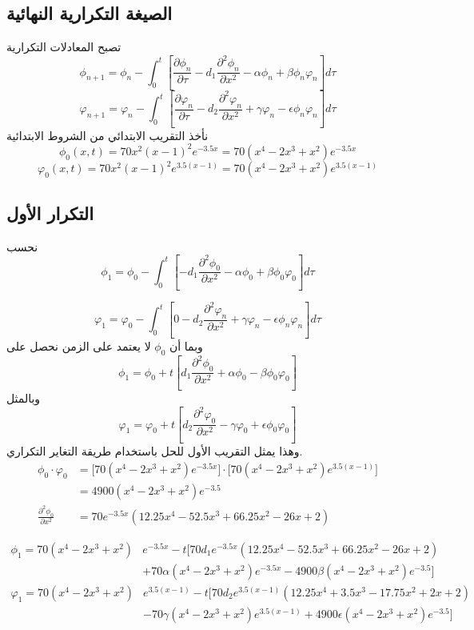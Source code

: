 \subsection*{الصيغة التكرارية النهائية}
تصبح المعادلات التكرارية
\[
\phi_{n+1} =
\phi_n -
\int_0^t
\left[
\frac{\partial \phi_n}{\partial \tau}
- d_1 \frac{\partial^2 \phi_n}{\partial x^2}
- \alpha \phi_n
+ \beta \phi_n \varphi_n
\right] d\tau
\]
\[
\varphi_{n+1} =
\varphi_n -
\int_0^t
\left[
\frac{\partial \varphi_n}{\partial \tau}
- d_2 \frac{\partial^2 \varphi_n}{\partial x^2}
+ \gamma \varphi_n
- \epsilon \phi_n \varphi_n
\right] d\tau
\]
نأخذ التقريب الابتدائي من الشروط الابتدائية
\[
\phi_0(x,t)=70x^2(x-1)^2 e^{-3.5 x} = 70 (x^4 - 2x^3 + x^2)e^{-3.5x} 
\]
\[
\varphi_0(x,t)=70x^2(x-1)^2 e^{3.5 (x-1)} = 70(x^4 - 2x^3 + x^2)e^{3.5(x-1)}
\]
\subsection*{التكرار الأول}
نحسب
\[
\phi_1=
\phi_0
-
\int_0^t
\left[
- d_1 \frac{\partial^2 \phi_0}{\partial x^2}
- \alpha \phi_0
+ \beta \phi_0 \varphi_0
\right] d\tau
\]

\[
\varphi_{1} =
\varphi_0 -
\int_0^t
\left[
0- d_2 \frac{\partial^2 \varphi_n}{\partial x^2}
+ \gamma \varphi_n
- \epsilon \phi_n \varphi_n
\right] d\tau
\]
وبما أن $\phi_0$ لا يعتمد على الزمن نحصل على
\[
\phi_1=
\phi_0
+
t
\left[
d_1 \frac{\partial^2 \phi_0}{\partial x^2}
+
\alpha \phi_0
-
\beta \phi_0 \varphi_0
\right]
\]
وبالمثل
\[
\varphi_1=
\varphi_0
+
t
\left[
d_2 \frac{\partial^2 \varphi_0}{\partial x^2}
-
\gamma \varphi_0
+
\epsilon \phi_0 \varphi_0
\right]
\]
وهذا يمثل التقريب الأول للحل باستخدام طريقة التغاير التكراري.
\begin{align*}
	\phi_0 \cdot \varphi_0 &= \Big[70 (x^4 - 2x^3 + x^2)e^{-3.5x}\Big]\cdot\Big[70(x^4 - 2x^3 + x^2)e^{3.5(x-1)}\Big]\\
	& = 4900 (x^4 - 2x^3 + x^2) e^{-3.5}\\
	\frac{\partial^2 \phi_0}{\partial x^2} &= 70e^{-3.5x} (12.25x^4 - 52.5x^3 + 66.25x^2 - 26x + 2)
\end{align*}

\[
\begin{split}
	\phi_1 = 70(x^4-2x^3+x^2)&e^{-3.5x} - t\Big[70d_1 e^{-3.5x} (12.25x^4 - 52.5x^3 + 66.25x^2 - 26x + 2)\\
	 &+70\alpha(x^4-2x^3+x^2)e^{-3.5x} - 4900\beta(x^4 - 2x^3 + x^2) e^{-3.5}\Big]
\end{split}
\]
\[
\begin{split}
	\varphi_{1} = 70(x^4 - 2x^3 + x^2)&e^{3.5(x-1)}- t\Big[70d_2 e^{3.5(x-1)} (12.25x^4 + 3.5x^3 - 17.75x^2+2x+2)\\
	& - 70\gamma(x^4-2x^3+x^2)e^{3.5(x-1)} + 4900\epsilon(x^4 - 2x^3 + x^2) e^{-3.5}
	\Big]
\end{split}
\]
